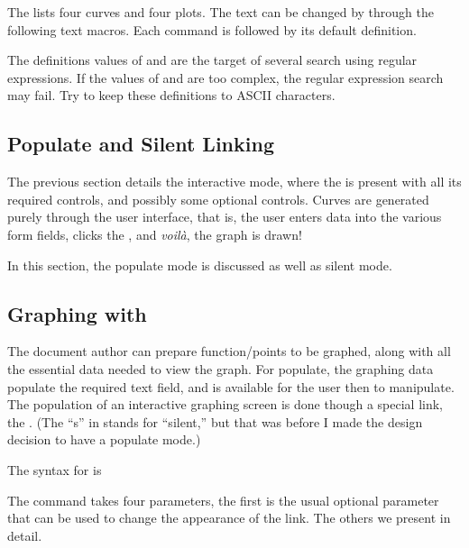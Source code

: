 \documentclass{article}
\begin{document}
The  lists four curves and four plots. The text can be changed by
through the following text macros. Each command is followed by its default definition.
\begin{dCmd*}{.75\linewidth}
\end{dCmd*}
The definitions values of  and  are the
target of several search using regular expressions. If the values of
 and  are too complex, the regular
expression search may fail. Try to keep these definitions to ASCII
characters.

\subsection{Populate and Silent Linking}

The previous section details the interactive mode, where the
 is present with all its required controls, and
possibly some optional controls. Curves are generated purely through
the user interface, that is, the user enters data into the various
form fields, clicks the , and \textsl{voil\`{a}}, the
graph is drawn!

In this section, the populate mode is discussed as well as silent mode.

\subsection{Graphing with \texorpdfstring{\protect{}}{}}\label{sgraphlink}

The document author can prepare function/points to be graphed, along
with all the essential data needed to view the graph. For populate,
the graphing data populate the required text field, and is available
for the user then to manipulate. The population of an interactive
graphing screen is done though a special link, the .
(The ``s'' in  stands for ``silent,'' but that was
before I made the design decision to have a populate mode.)

The syntax for  is
\begin{dCmd}{\linewidth}
\end{dCmd}
\PD The command takes four parameters, the first is the usual
optional parameter that can be used to change the appearance of the
link. The others we present in detail.
\end{document}
